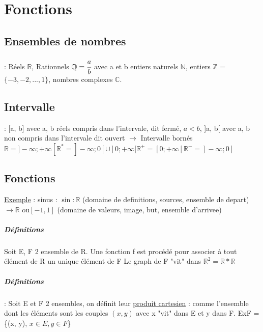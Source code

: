 \chapter{Fonctions}

\section{Ensembles de nombres} : Réels $\mathbb{R}$, Rationnels $\mathbb{Q} = \cfrac{a}{b}$ avec a et b entiers naturels $\mathbb{N}$, entiers $\mathbb{Z}$ = $\{-3, -2, ..., 1\}$, nombres complexes $\mathbb{C}$.
\section{Intervalle} : [a, b] avec a, b réels compris dans l'intervale, dit fermé, $a < b$, ]a, b[ avec a, b non compris dans l'intervale dit ouvert $\rightarrow$ Intervalle bornés
$\mathbb{R} = ]-\infty; +\infty[ \mathbb{R}^* = ]-\infty; 0[ \cup ]0; +\infty[ \mathbb{R}^+ = [0; +\infty[ \mathbb{R}^- = ]-\infty; 0]$

\section{Fonctions}
\ul{Exemple} : sinus : $\sin : \mathbb{R}$ (domaine de definitions, sources, ensemble de depart) $\rightarrow \mathbb{R}$ ou$ [-1, 1]$ (domaine de valeurs, image, but, ensemble d'arrivee)


\paragraph{Définitions} Soit E, F 2 ensemble de R. Une fonction f est procédé pour associer à tout élément de R un unique élément de F
Le graph de F "vit" dans $\mathbb{R}^2 = \mathbb{R}*\mathbb{R}$
\paragraph{Définitions} : Soit E et F 2 ensembles, on définit leur \ul{produit cartesien} :  comme l'ensemble dont les éléments sont les couples $(x, y)$ avec x "vit" dans E et y dans F. ExF = \{(x, y), $x \in E, y \in F$\}
